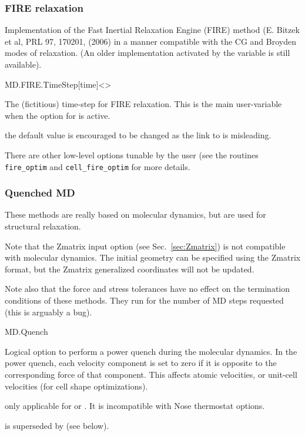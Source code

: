 \subsubsection{FIRE relaxation}

Implementation of the Fast Inertial Relaxation Engine (FIRE) method
(E. Bitzek et al, PRL 97, 170201, (2006) in a manner compatible with
the CG and Broyden modes of relaxation. (An older implementation
activated by the  variable is still available).

\begin{fdfentry}{MD.FIRE.TimeStep}[time]<>
  
  The (fictitious) time-step for FIRE relaxation.  This is the main
  user-variable when the option  for
   is active.

  \note the default value is encouraged to be changed as the link to
   is misleading.

  There are other low-level options tunable by the user (see the
  routines \texttt{fire\_optim} and \texttt{cell\_fire\_optim} for
  more details.

\end{fdfentry}


\ifdeprecated

\subsubsection{Quenched MD}

These methods are really based on molecular dynamics, but are used for
structural relaxation.

Note that the Zmatrix input option (see Sec.~\ref{sec:Zmatrix}) is not
compatible with molecular dynamics. The initial geometry can be
specified using the Zmatrix format, but the Zmatrix generalized
coordinates will not be updated.

Note also that the force and stress tolerances have no effect on
the termination conditions of these methods. They run for the number
of MD steps requested (this is arguably a bug).

\begin{fdflogicalF}{MD.Quench}

  Logical option to perform a power quench during the molecular
  dynamics.  In the power quench, each velocity component is set to
  zero if it is opposite to the corresponding force of that
  component. This affects atomic velocities, or unit-cell velocities
  (for cell shape optimizations).

  \note only applicable for  or
  .
  It is incompatible with Nose thermostat options.  

  \note {} is superseded by  (see
  below).

\end{fdflogicalF}


